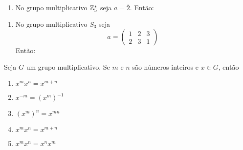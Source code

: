 \documentclass{beamer}
\begin{document}
    \begin{frame}
        \begin{exemplos}
            \begin{enumerate}[label={\arabic*})]
                \conti
                \item No grupo multiplicativo $\mathbb{Z}_5^*$ seja $a = \overline{2}$. Então:
                \seti
            \end{enumerate}
        \end{exemplos}
    \end{frame}

    \begin{frame}
        \begin{exemplos}
            \begin{enumerate}[label={\arabic*})]
                \conti
                \item No grupo multiplicativo $S_3$ seja
                \[
                    a = \begin{pmatrix}
                        1 & 2 & 3\\ 2 & 3 & 1
                    \end{pmatrix}
                \]
                Então:
            \end{enumerate}
        \end{exemplos}
    \end{frame}

    \begin{frame}
        \begin{proposicao}
            Seja $G$ um grupo multiplicativo. Se $m$ e $n$ são números inteiros e $x \in G$, então
            \begin{enumerate}[label={\arabic*})]
                \item $x^mx^n = x^{m + n}$

                \item $x^{-m} = (x^m)^{-1}$

                \item $(x^m)^n = x^{mn}$

                \item $x^mx^n = x^{m + n}$

                \item $x^mx^n = x^nx^m$
            \end{enumerate}
        \end{proposicao}
    \end{frame}
\end{document}
